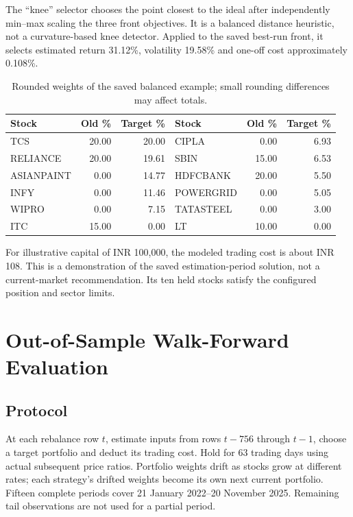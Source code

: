 \documentclass[12pt,a4paper]{article}
\newcommand{\newsec}[1]{\section{#1}}
\begin{document}
The ``knee'' selector chooses the point closest to the ideal after independently min--max scaling the three front objectives. It is a balanced distance heuristic, not a curvature-based knee detector. Applied to the saved best-run front, it selects estimated return 31.12\%, volatility 19.58\% and one-off cost approximately 0.108\%.
\begin{table}[H]\centering\small
\begin{tabular}{@{}lrrlrr@{}}\toprule
Stock & Old \% & Target \% & Stock & Old \% & Target \%\\\midrule
TCS &20.00&20.00& CIPLA &0.00&6.93\\
RELIANCE &20.00&19.61& SBIN &15.00&6.53\\
ASIANPAINT &0.00&14.77& HDFCBANK &20.00&5.50\\
INFY &0.00&11.46& POWERGRID &0.00&5.05\\
WIPRO &0.00&7.15& TATASTEEL &0.00&3.00\\
ITC &15.00&0.00& LT &10.00&0.00\\\bottomrule
\end{tabular}
\caption{Rounded weights of the saved balanced example; small rounding differences may affect totals.}
\end{table}
For illustrative capital of INR 100,000, the modeled trading cost is about INR 108. This is a demonstration of the saved estimation-period solution, not a current-market recommendation. Its ten held stocks satisfy the configured position and sector limits.

\newsec{Out-of-Sample Walk-Forward Evaluation}
\subsection{Protocol}
At each rebalance row $t$, estimate inputs from rows $t-756$ through $t-1$, choose a target portfolio and deduct its trading cost. Hold for 63 trading days using actual subsequent price ratios. Portfolio weights drift as stocks grow at different rates; each strategy's drifted weights become its own next current portfolio. Fifteen complete periods cover 21 January 2022--20 November 2025. Remaining tail observations are not used for a partial period.
\end{document}
